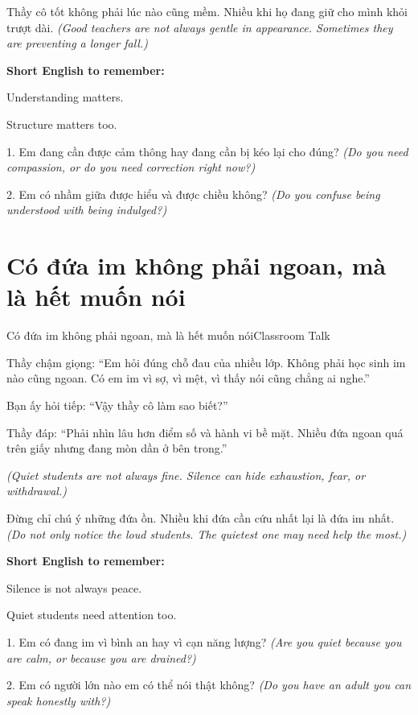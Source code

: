 \begin{baihoc}
Thầy cô tốt không phải lúc nào cũng mềm. Nhiều khi họ đang giữ cho mình khỏi trượt dài.
\textit{(Good teachers are not always gentle in appearance. Sometimes they are preventing a longer fall.)}
\end{baihoc}

\begin{ghinhoanh}
\textbf{Short English to remember:}

Understanding matters.

Structure matters too.
\end{ghinhoanh}

\begin{tuhocnhanh}
1. Em đang cần được cảm thông hay đang cần bị kéo lại cho đúng? \textit{(Do you need compassion, or do you need correction right now?)}

2. Em có nhầm giữa được hiểu và được chiều không? \textit{(Do you confuse being understood with being indulged?)}
\end{tuhocnhanh}
\ngancach

\section{Có đứa im không phải ngoan, mà là hết muốn nói}
\begin{truyen}{Có đứa im không phải ngoan, mà là hết muốn nói}{Classroom Talk}

Thầy chậm giọng: ``Em hỏi đúng chỗ đau của nhiều lớp. Không phải học sinh im nào cũng ngoan. Có em im vì sợ, vì mệt, vì thấy nói cũng chẳng ai nghe.''

Bạn ấy hỏi tiếp: ``Vậy thầy cô làm sao biết?''

Thầy đáp: ``Phải nhìn lâu hơn điểm số và hành vi bề mặt. Nhiều đứa ngoan quá trên giấy nhưng đang mòn dần ở bên trong.''

\textit{(Quiet students are not always fine. Silence can hide exhaustion, fear, or withdrawal.)}
\end{truyen}

\begin{baihoc}
Đừng chỉ chú ý những đứa ồn. Nhiều khi đứa cần cứu nhất lại là đứa im nhất.
\textit{(Do not only notice the loud students. The quietest one may need help the most.)}
\end{baihoc}

\begin{ghinhoanh}
\textbf{Short English to remember:}

Silence is not always peace.

Quiet students need attention too.
\end{ghinhoanh}

\begin{tuhocnhanh}
1. Em có đang im vì bình an hay vì cạn năng lượng? \textit{(Are you quiet because you are calm, or because you are drained?)}

2. Em có người lớn nào em có thể nói thật không? \textit{(Do you have an adult you can speak honestly with?)}
\end{tuhocnhanh}
\ngancach
